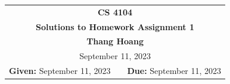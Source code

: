 \documentclass[11pt,twoside]{article}
\newcommand{\coursenumber}{CS 4104}
\newcommand{\docdate}{August 31, 2023}
\newcommand{\duedate}{September 11, 2023}
\newcommand{\homeworknumber}{1}
\newcommand{\doctitle}{Solutions to Homework Assignment \homeworknumber}
\newcommand{\doctitle}{Homework Assignment \homeworknumber}
\renewcommand{\docdate}{\duedate}
\renewcommand{\author}{Thang Hoang}
\begin{document}
\thispagestyle{empty}

\begin{center}
\begin{tabular}{lcr}
\multicolumn{3}{c}{\Large\textbf{\coursenumber}}
\\[0.04in]
\multicolumn{3}{c}{\Large\textbf{\doctitle}}
\ifthenelse{\boolean{solutions}}{%
\\[0.04in]\multicolumn{3}{c}{\large\textbf{\author}}
}{} %
\ifthenelse{\boolean{solutions}}{%
\\[0.10in]\multicolumn{3}{c}{\duedate}
}{%
\\[0.10in]
\textbf{Given:} \docdate
& \hspace*{1.0in} &
\textbf{Due:} \duedate
}
\end{tabular}
\end{center}
\end{document}
